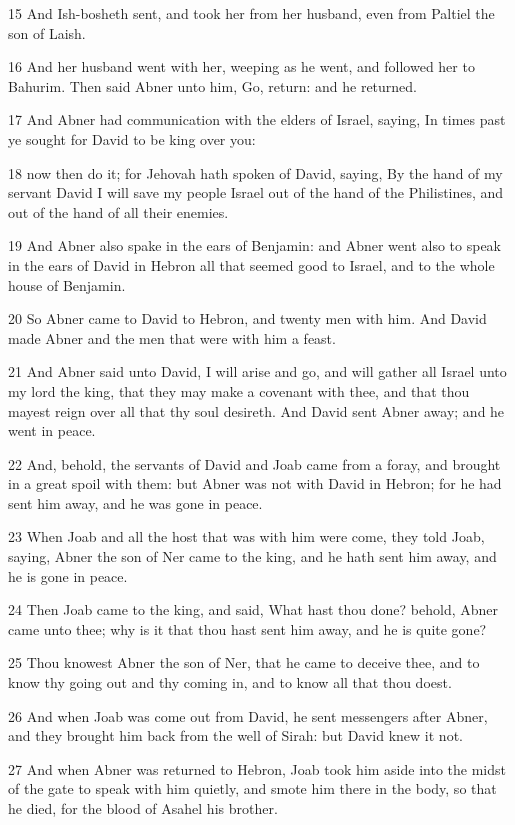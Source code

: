 \par 15 And Ish-bosheth sent, and took her from her husband, even from Paltiel the son of Laish.
\par 16 And her husband went with her, weeping as he went, and followed her to Bahurim. Then said Abner unto him, Go, return: and he returned.
\par 17 And Abner had communication with the elders of Israel, saying, In times past ye sought for David to be king over you:
\par 18 now then do it; for Jehovah hath spoken of David, saying, By the hand of my servant David I will save my people Israel out of the hand of the Philistines, and out of the hand of all their enemies.
\par 19 And Abner also spake in the ears of Benjamin: and Abner went also to speak in the ears of David in Hebron all that seemed good to Israel, and to the whole house of Benjamin.
\par 20 So Abner came to David to Hebron, and twenty men with him. And David made Abner and the men that were with him a feast.
\par 21 And Abner said unto David, I will arise and go, and will gather all Israel unto my lord the king, that they may make a covenant with thee, and that thou mayest reign over all that thy soul desireth. And David sent Abner away; and he went in peace.
\par 22 And, behold, the servants of David and Joab came from a foray, and brought in a great spoil with them: but Abner was not with David in Hebron; for he had sent him away, and he was gone in peace.
\par 23 When Joab and all the host that was with him were come, they told Joab, saying, Abner the son of Ner came to the king, and he hath sent him away, and he is gone in peace.
\par 24 Then Joab came to the king, and said, What hast thou done? behold, Abner came unto thee; why is it that thou hast sent him away, and he is quite gone?
\par 25 Thou knowest Abner the son of Ner, that he came to deceive thee, and to know thy going out and thy coming in, and to know all that thou doest.
\par 26 And when Joab was come out from David, he sent messengers after Abner, and they brought him back from the well of Sirah: but David knew it not.
\par 27 And when Abner was returned to Hebron, Joab took him aside into the midst of the gate to speak with him quietly, and smote him there in the body, so that he died, for the blood of Asahel his brother.

